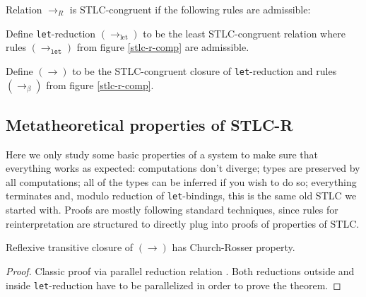 \documentclass[acmsmall, review, screen, authorversion]{acmart}
\begin{document}
\begin{definition}
    Relation $\to_R$ is STLC-congruent if the following rules are
    admissible:
\end{definition}

\begin{definition}
    Define \texttt{let}-reduction $(\to_\mathrm{let})$ to be the
    least STLC-congruent relation where rules $(\to_\mathtt{let})$
    from figure \ref{stlc-r-comp} are admissible.
\end{definition}

\begin{definition}
    Define $(\to)$ to be the STLC-congruent closure of
    \texttt{let}-reduction and rules $(\to_\beta)$ from figure
    \ref{stlc-r-comp}.
\end{definition}

\subsection{Metatheoretical properties of STLC-R}

Here we only study some basic properties of a system to make sure
that everything works as expected: computations don't diverge; types
are preserved by all computations; all of the types can be inferred
if you wish to do so; everything terminates and, modulo reduction of
\texttt{let}-bindings, this is the same old STLC we started with.
Proofs are mostly following standard techniques, since rules for
reinterpretation are structured to directly plug into proofs of
properties of STLC.

\begin{theorem}
    Reflexive transitive closure of $(\to)$ has Church-Rosser
    property.
\end{theorem}
\begin{proof}
    Classic proof via parallel reduction relation \cite{CRproof}.
    Both reductions outside and inside \texttt{let}-reduction have to
    be parallelized in order to prove the theorem.
\end{proof}
\end{document}
